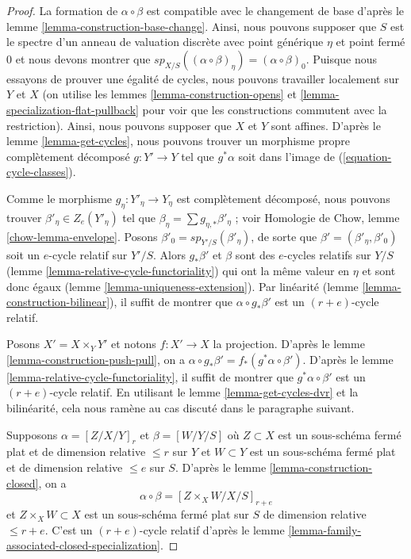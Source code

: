 \begin{proof}
 La formation de $\alpha \circ \beta$ est compatible avec le changement de base d'après
 le lemme \ref{lemma-construction-base-change}. Ainsi, nous pouvons supposer que 
$S$ est le spectre d'un anneau de valuation discrète avec point générique  
$\eta$  et point fermé $0$  et nous devons montrer que  
$sp_{X/S}((\alpha \circ \beta)_\eta) = (\alpha \circ \beta)_0$.
 Puisque nous essayons de prouver une égalité de cycles, nous pouvons travailler
 localement sur  $Y$ et $X$ (on utilise les
 lemmes \ref{lemma-construction-opens} et 
\ref{lemma-specialization-flat-pullback} pour 
voir que les constructions commutent avec la restriction). Ainsi, nous
 pouvons supposer que $X$ et $Y$ sont affines. 
D'après le lemme \ref{lemma-get-cycles}, 
nous pouvons trouver un morphisme propre complètement décomposé  
$g : Y' \to Y$  tel que $g^*\alpha$  soit dans l'image de 
(\ref{equation-cycle-classes}). 

\medskip\noindent
 Comme le morphisme $g_\eta : Y'_\eta \to Y_\eta$
 est complètement décomposé, nous pouvons trouver $\beta'_\eta \in Z_e(Y'_\eta)$ tel que 
$\beta_\eta = \sum g_{\eta, *}\beta'_\eta$ ; voir
 Homologie de Chow, lemme \ref{chow-lemma-envelope}. 
Posons $\beta'_0 = sp_{Y'/S}(\beta'_\eta)$, de sorte que 
$\beta' = (\beta'_\eta, \beta'_0)$ soit un $e$-cycle relatif sur  $Y'/S$. Alors  
$g_*\beta'$  et  $\beta$ sont des $e$-cycles relatifs
 sur $Y/S$ (lemme \ref{lemma-relative-cycle-functoriality})
 qui ont la même valeur en $\eta$ et sont donc égaux 
(lemme \ref{lemma-uniqueness-extension}). Par linéarité 
(lemme \ref{lemma-construction-bilinear}),
 il suffit de montrer que $\alpha \circ g_*\beta'$
 est un $(r + e)$-cycle relatif. 

\medskip\noindent
 Posons $X' = X \times_Y Y'$ et notons $f : X' \to X$ la projection. D'après
 le lemme \ref{lemma-construction-push-pull}, on a 
$\alpha \circ g_*\beta' = f_*(g^*\alpha \circ \beta')$. 
D'après le lemme \ref{lemma-relative-cycle-functoriality}, 
il suffit de montrer que  $g^*\alpha \circ \beta'$
  est un  $(r + e)$-cycle relatif. En utilisant le lemme \ref{lemma-get-cycles-dvr} 
et la bilinéarité, cela nous ramène au cas discuté dans le paragraphe suivant. 

\medskip\noindent
 Supposons  $\alpha = [Z/X/Y]_r$  et  $\beta = [W/Y/S]$
  où  $Z \subset X$  est un sous-schéma fermé plat et de dimension
 relative  $\leq r$  sur  $Y$  et  $W \subset Y$  est un 
sous-schéma fermé plat et de dimension relative  $\leq e$  sur  $S$. 
D'après le lemme \ref{lemma-construction-closed}, on a 
$$
\alpha \circ \beta = [Z \times_X W/X/S]_{r + e}
$$
 et  $Z \times_X W \subset X$  est un sous-schéma fermé plat sur  $S$
  de dimension relative $\leq r + e$. C'est un $(r + e)$-cycle relatif d'après
 le lemme \ref{lemma-family-associated-closed-specialization}. 
\end{proof} 

